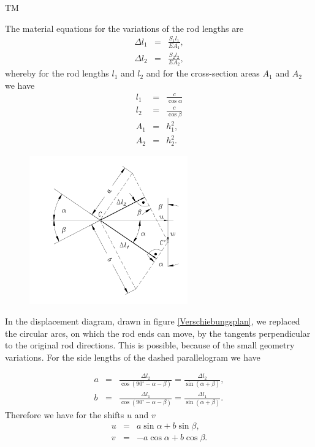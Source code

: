 \begin{example}{TM}

\noindent 
The material equations for the variations of the rod lengths are
\begin{eqnarray}
\Delta l_1 &=& \frac{S_1 l_1}{E A_1}, \\
\Delta l_2 &=& \frac{S_2 l_2}{E A_2},
\end{eqnarray}
whereby for the rod lengths $l_1$ and $l_2$ and for the cross-section areas $A_1$ and $A_2$ we have
\begin{eqnarray}
l_1 &=& \frac{c}{\cos \alpha} \label{l1} \\
l_2 &=& \frac{c}{\cos \beta}  \label{l2} \\
A_1 &=& h_1^2, \\
A_2 &=& h_2^2.
\end{eqnarray}


\begin {figure} [htbp]
\begin {center}
\includegraphics[height=6.4cm]{vschplan.png}
\caption {}%
\end {center}
\end {figure}

In the displacement diagram, drawn in figure \ref{Verschiebungsplan}, we replaced the circular arcs, on which the rod ends can move,  by the  tangents perpendicular to the  original rod directions. This is possible, because of the small geometry variations. For the side lengths of the dashed parallelogram we have 

\begin{eqnarray}
a &=& \frac{\Delta l_2}{\cos(90^\circ - \alpha - \beta)}
  = \frac{\Delta l_2}{\sin(\alpha + \beta)}, \\
b &=& \frac{\Delta l_1}{\cos(90^\circ - \alpha - \beta)}
  = \frac{\Delta l_1}{\sin(\alpha + \beta)}.
\end{eqnarray}
Therefore we have for the shifts $u$ and $v$ 
\begin{eqnarray}
u &=& a \sin \alpha + b \sin \beta, \\
v &=& -a \cos \alpha + b \cos \beta. \label{TMGS12}
\end{eqnarray}


\end{example}
